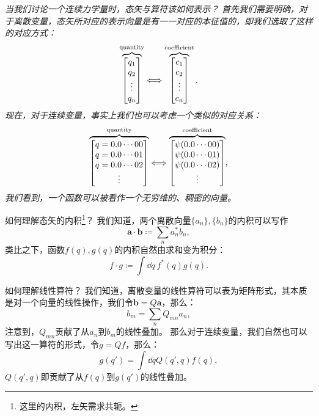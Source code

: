 \begin{tcolorbox}[breakable, colframe=purple, colback=red!10, title={\textbf{关于连续力学量的算符}}]
\it\small
当我们讨论一个连续力学量时，态矢与算符该如何表示？
首先我们需要明确，对于离散变量，态矢所对应的表示向量是有一一对应的本征值的，即我们选取了这样的对应方式：
\begin{equation}
    \overbrace{
    \begin{bmatrix}
        q_1 \\ q_2 \\ \vdots \\ q_n
    \end{bmatrix}}^{\rm{quantity}}
    \Longleftrightarrow
    \overbrace{
    \begin{bmatrix}
        c_1 \\ c_2 \\ \vdots \\ c_n
    \end{bmatrix}}^{\rm{coefficient}}.
\end{equation}
现在，对于连续变量，事实上我们也可以考虑一个类似的对应关系：
\begin{equation}
    \overbrace{
    \begin{bmatrix}
        q=0.0 \cdots 00 \\ q=0.0 \cdots 01 \\ q=0.0 \cdots 02 \\ \vdots
    \end{bmatrix}}^{\rm{quantity}}
    \Longleftrightarrow
    \overbrace{
    \begin{bmatrix}
        \psi(0.0 \cdots 00) \\ \psi(0.0 \cdots 01) \\ \psi(0.0 \cdots 02) \\ \vdots
    \end{bmatrix}}^{\rm{coefficient}},
\end{equation}
我们看到，一个函数可以被看作一个无穷维的、稠密的向量。

如何理解态矢的内积\footnote{这里的内积，左矢需求共轭。}？
我们知道，两个离散向量$\{a_n\},\{b_n\}$的内积可以写作
\begin{equation}
    \bm{a}\cdot\bm{b} \coloneq \sum_n a_n^* b_n,
\end{equation}
类比之下，函数$f(q), g(q)$的内积自然由求和变为积分：
\begin{equation}
    f \cdot g \coloneq \int \dd q\ f^*(q) g(q).
\end{equation}

如何理解线性算符？
我们知道，离散变量的线性算符可以表为矩阵形式，其本质是对一个向量的线性操作，我们令$\bm{b}=Q\bm{a}$，那么：
\begin{equation}
    b_m = \sum_n Q_{mn} a_n,
\end{equation}
注意到，$Q_{mn}$贡献了从$a_n$到$b_m$的线性叠加。
那么对于连续变量，我们自然也可以写出这一算符的形式，令$g=Qf$，那么：
\begin{equation}
    \label{eq:cmr_operator_cont}
    g(q') = \int \dd q Q(q',q) f(q),
\end{equation}
$Q(q',q)$即贡献了从$f(q)$到$g(q')$的线性叠加。


\end{tcolorbox}
